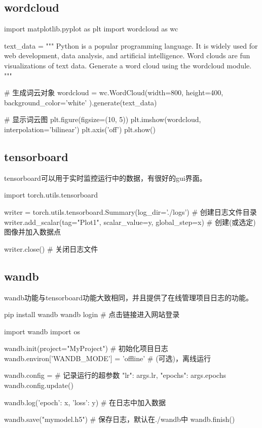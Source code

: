   \subsection{wordcloud}
    \begin{codeblock}[language=python, caption={wordcloud}]
      import matplotlib.pyplot as plt
      import wordcloud as wc

      text_data = """
      Python is a popular programming language.
      It is widely used for web development, data analysis, and artificial intelligence.
      Word clouds are fun visualizations of text data.
      Generate a word cloud using the wordcloud module.
      """

      # 生成词云对象
      wordcloud = wc.WordCloud(width=800, 
          height=400, 
          background_color='white'
          ).generate(text_data)

      # 显示词云图
      plt.figure(figsize=(10, 5))
      plt.imshow(wordcloud, interpolation='bilinear')
      plt.axis('off')
      plt.show()
    \end{codeblock}

  \subsection{tensorboard}
    tensorboard可以用于实时监控运行中的数据，有很好的gui界面。
    \begin{codeblock}[language=python, caption=tensorboard]
      import torch.utils.tensorboard

      writer = torch.utils.tensorboard.Summary(log_dir='./logs') # 创建日志文件目录
      writer.add_scalar(tag="Plot1", scalar_value=y, global_step=x) # 创建(或选定)图像并加入数据点

      writer.close() # 关闭日志文件
    \end{codeblock}

  \subsection{wandb}
    wandb功能与tensorboard功能大致相同，并且提供了在线管理项目日志的功能。
    \begin{codeblock}[language={bash}, caption={wandb login}]
      pip install wandb
      wandb login # 点击链接进入网站登录
    \end{codeblock}

    \begin{codeblock}[language=python, caption={wandb}]
      import wandb
      import os

      wandb.init(project="MyProject") # 初始化项目日志
      wandb.environ['WANDB_MODE'] = 'offline' # (可选)，离线运行

      wandb.config = { # 记录运行的超参数
        "lr": args.lr,
        "epochs": args.epochs
      }
      wandb.config.update()

      wandb.log({'epoch': x, 'loss': y}) # 在日志中加入数据

      wandb.save("mymodel.h5") # 保存日志，默认在./wandb中
      wandb.finish()
    \end{codeblock}
